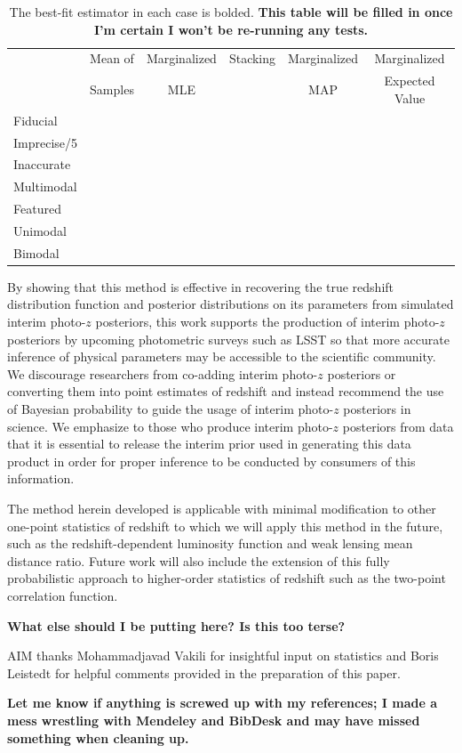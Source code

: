 \documentclass[preprint]{aastex}
\begin{document}
\begin{table}
\begin{tabular}{lccccc}
& Mean of & Marginalized & Stacking & Marginalized & Marginalized\\
& Samples & MLE & & MAP & Expected Value\\
Fiducial &&&&&\\
Imprecise/5 &&&&&\\
Inaccurate &&&&&\\
Multimodal &&&&&\\
Featured &&&&&\\
Unimodal &&&&&\\
Bimodal &&&&&
\end{tabular}
\caption{The best-fit estimator in each case is bolded.  \textbf{This table 
will be filled in once I'm certain I won't be re-running any tests.}}
\label{tab:kld}
\end{table}

By showing that this method is effective in recovering the true redshift 
distribution function and posterior distributions on its parameters from 
simulated interim photo-$z$ posteriors, this work supports the production of 
interim photo-$z$ posteriors by upcoming photometric surveys such as LSST so 
that more accurate inference of physical parameters may be accessible to the 
scientific community.  We discourage researchers from co-adding interim 
photo-$z$ posteriors or converting them into point estimates of redshift and 
instead recommend the use of Bayesian probability to guide the usage of interim 
photo-$z$ posteriors in science.  We emphasize to those who produce interim 
photo-$z$ posteriors from data that it is essential to release the interim 
prior used in generating this data product in order for proper inference to be 
conducted by consumers of this information.

The method herein developed is applicable with minimal modification to other 
one-point statistics of redshift to which we will apply this method in the 
future, such as the redshift-dependent luminosity function and weak lensing 
mean distance ratio.  Future work will also include the extension of this fully 
probabilistic approach to higher-order statistics of redshift such as the 
two-point correlation function.

\textbf{What else should I be putting here?  Is this too terse?}


\begin{acknowledgements}
AIM thanks Mohammadjavad Vakili for insightful input on statistics and Boris 
Leistedt for helpful comments provided in the preparation of this paper.
\end{acknowledgements}

\textbf{Let me know if anything is screwed up with my references; I made a mess 
wrestling with Mendeley and BibDesk and may have missed something when cleaning 
up.}


\end{document}
